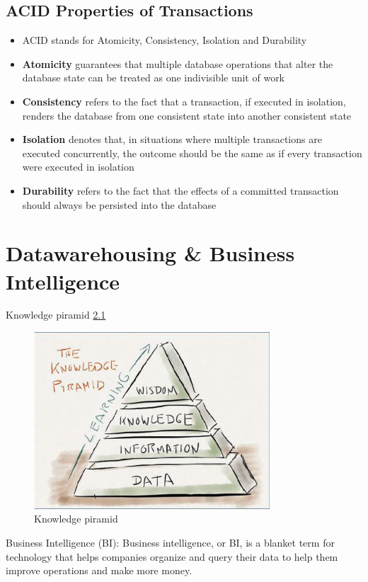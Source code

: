 \documentclass{report}
\begin{document}
	\section{ACID Properties of Transactions}
	\begin{itemize}
		\item ACID stands for Atomicity, Consistency, Isolation and Durability
		\item \textbf{Atomicity} guarantees that multiple database operations that alter the database state can be treated as one indivisible unit of work
		\item \textbf{Consistency} refers to the fact that a transaction, if executed in isolation, renders the database from one consistent state into another consistent state
		\item \textbf{Isolation} denotes that, in situations where multiple transactions are executed concurrently, the outcome should be the same as if every transaction were executed in isolation
		\item \textbf{Durability} refers to the fact that the effects of a
		committed transaction should always be persisted into
		the database
	\end{itemize}
	\chapter{Datawarehousing \& Business Intelligence}
	Knowledge piramid \ref{fig:knowledge-piramid}
	\begin{figure}
		\includegraphics[width=250pt]{./images/knowledge-piramid.png}
		\caption{\label{fig:knowledge-piramid}Knowledge piramid}
	\end{figure}
	Business Intelligence (BI): Business intelligence, or BI, is a blanket term for technology that helps companies organize and query their data to help them improve operations and make more money.
	
\end{document}
